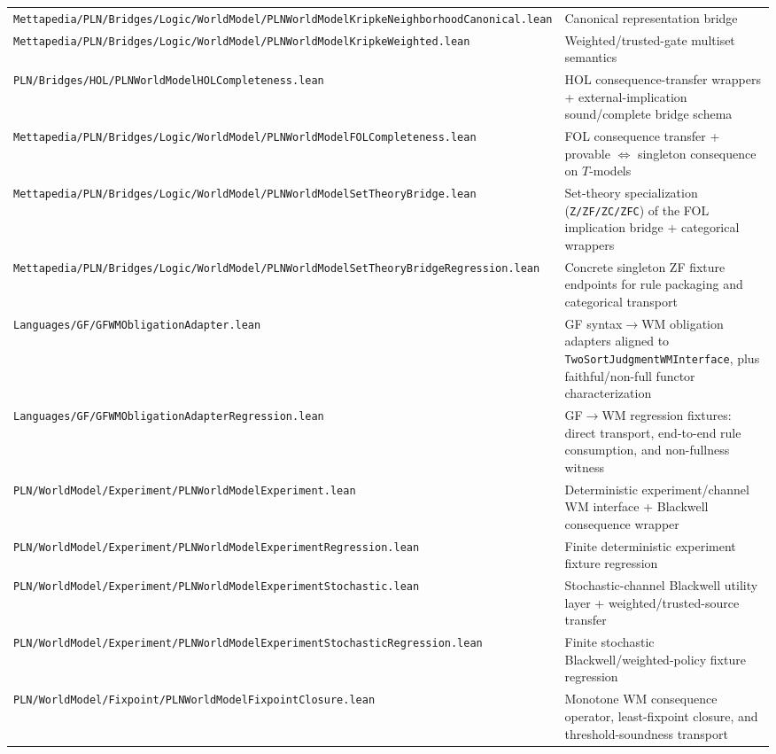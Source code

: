 \documentclass[]{article}
\newcommand{\code}[1]{\texttt{#1}}
\begin{document}
\begin{longtable}{p{}p{}}
\code{Mettapedia/PLN/Bridges/Logic/WorldModel/PLNWorldModelKripkeNeighborhoodCanonical.lean} &
  Canonical representation bridge \\
\code{Mettapedia/PLN/Bridges/Logic/WorldModel/PLNWorldModelKripkeWeighted.lean} &
  Weighted/trusted-gate multiset semantics \\
\code{PLN/Bridges/HOL/PLNWorldModelHOLCompleteness.lean} &
  HOL consequence-transfer wrappers +
  external-implication sound/complete bridge schema \\
\code{Mettapedia/PLN/Bridges/Logic/WorldModel/PLNWorldModelFOLCompleteness.lean} &
  FOL consequence transfer +
  provable $\Leftrightarrow$ singleton consequence on $T$-models \\
\code{Mettapedia/PLN/Bridges/Logic/WorldModel/PLNWorldModelSetTheoryBridge.lean} &
  Set-theory specialization (\code{Z/ZF/ZC/ZFC}) of the FOL
  implication bridge + categorical wrappers \\
\code{Mettapedia/PLN/Bridges/Logic/WorldModel/PLNWorldModelSetTheoryBridgeRegression.lean} &
  Concrete singleton ZF fixture endpoints for rule packaging
  and categorical transport \\
\code{Languages/GF/GFWMObligationAdapter.lean} &
  GF syntax$\rightarrow$WM obligation adapters aligned to
  \code{TwoSortJudgmentWMInterface}, plus
  faithful/non-full functor characterization \\
\code{Languages/GF/GFWMObligationAdapterRegression.lean} &
  GF$\rightarrow$WM regression fixtures: direct transport, end-to-end
  rule consumption, and non-fullness witness \\
\code{PLN/WorldModel/Experiment/PLNWorldModelExperiment.lean} &
  Deterministic experiment/channel WM interface + Blackwell consequence wrapper \\
\code{PLN/WorldModel/Experiment/PLNWorldModelExperimentRegression.lean} &
  Finite deterministic experiment fixture regression \\
\code{PLN/WorldModel/Experiment/PLNWorldModelExperimentStochastic.lean} &
  Stochastic-channel Blackwell utility layer + weighted/trusted-source transfer \\
\code{PLN/WorldModel/Experiment/PLNWorldModelExperimentStochasticRegression.lean} &
  Finite stochastic Blackwell/weighted-policy fixture regression \\
\code{PLN/WorldModel/Fixpoint/PLNWorldModelFixpointClosure.lean} &
  Monotone WM consequence operator, least-fixpoint closure, and
  threshold-soundness transport \\

\end{longtable}
\end{document}
